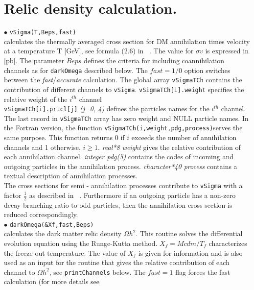 \documentclass[12pt,a4paper]{article}
\begin{document}
\section{ Relic density calculation.}

$\bullet$ \verb|vSigma(T,Beps,fast)|\\
calculates the thermally averaged cross section for DM annihilation  times velocity  
at a  temperature T [GeV], see formula (2.6) in ~\cite{Belanger:2001fz}. The value for $\sigma v$ 
is expressed in [pb].  The parameter $Beps$ defines the criteria for including coannihilation
channels as for {\tt darkOmega} described below.
The $fast=1/0$ option switches between the {\it fast}/{\it accurate} calculation. 
The global array {\tt vSigmaTCh} contains the 
contribution of different channels to {\tt vSigma}. \verb|vSigmaTCh[i].weight| specifies the relative
weight of the $i^{th}$ channel \\
\verb|vSigmaTCh[i].prtcl[j]|  {\it (j=0, 4)}  defines the particles names for the $i^{th}$
channel.\\
The last record in \verb|vSigmaTCh| array has zero weight and 
NULL particle names.  In the Fortran version, the function 
 \verb|vSigmaTCh(i,weight,pdg,process)|serves the same purpose.  This function returns 0
if $i$  exceeds the number of annihilation  channels and 1 otherwise, $i\ge 1$. 
 {\it real*8 weight} gives the relative contribution of each
annihilation channel. {\it integer pdg(5)} contains the codes of incoming and
outgoing particles in the  annihilation process.  {\it character*40  process}
contains a textual description of annihilation processes.\\
The cross sections for  semi - annihilation processes  contribute to {\tt vSigma} with a
factor $\frac{1}{2}$ as described in ~\cite{Belanger:2012vp}. Furthermore if an outgoing particle has a non-zero
decay branching ratio to  odd particles, then the  annihilation  cross section  is reduced
correspondingly.\\    
\noindent 
$\bullet$ \verb|darkOmega(&Xf,fast,Beps)|\\
calculates the dark matter relic density $\Omega h^2$. 
This routine  solves the differential evolution equation  using the Runge-Kutta method. 
$X_f=Mcdm/T_{f}$
characterizes the freeze-out temperature.   The value of $X_f$ is given for
information and is also used as an input for the routine that
gives the relative contribution of each channel to $\Omega h^2$,
see \verb|printChannels|  below. The  $fast=1$ flag forces the
fast calculation (for more details see
\end{document}
